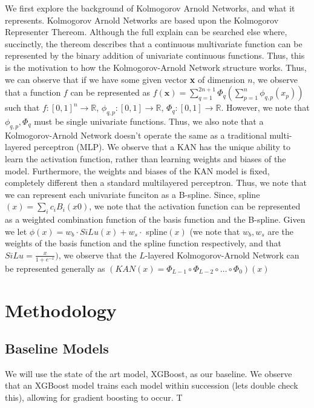 \documentclass{article} %
\begin{document}
We first explore the background of Kolmogorov Arnold Networks, and what it represents. Kolmogorov Arnold Networks are based upon the Kolmogorov Representer Thereom. Although the
full explain can be searched else where, succinctly, the thereom describes that a continuous multivariate function can be represented by the binary addition of
univariate continuous functions. Thus, this is the motivation to how the Kolmogorov-Arnold Network structure works. Thus, we can observe that if we have some given vector \textbf{x} of dimension $n$,
we observe that a function $f$ can be represented as $f(\textbf{x}) = \sum_{q = 1}^{2n + 1} \Phi_q(\sum_{p = 1}^{n}\phi_{q,p}(x_p))$ such that $f : [0,1]^{n} \rightarrow \mathbb{R} $, $\phi_{q,p}: [0,1] \rightarrow \mathbb{R}$, $\Phi_q : [0,1] \rightarrow \mathbb{R}$.
However, we note that $\phi_{q,p}, \Phi_q$ must be single univariate functions.
Thus, we also note that a Kolmogorov-Arnold
Network doesn't operate the same as a traditional multi-layered perceptron (MLP). We observe that a KAN has the unique ability to learn the activation function, rather than
learning weights and biases of the model. Furthermore, the weights and biases of the KAN model is fixed, completely different then a standard multilayered perceptron. Thus,
we note that we can represent each univariate funciton as a B-spline. Since, spline$(x) = \sum_i c_iB_i(x0)$, we note that the activation function can be represented as 
a weighted combination function of the basis function and the B-spline. Given we let $\phi(x) = w_b \cdot SiLu(x) + w_s \cdot$ spline$(x)$ (we note that $w_b,w_s$ are the weights of the basis function and the spline function respectively, and that $SiLu = \frac{x}{1 + e^{-x}})$,
we observe that the $L$-layered Kolmogorov-Arnold Network can be represented generally as $(KAN(x) = \Phi_{L-1} \circ \Phi_{L-2} \circ \dots \circ \Phi_0)(x)$

\section{Methodology}

\subsection{Baseline Models}

We will use the state of the art model, XGBoost, as our baseline. We observe that an XGBoost model trains each model within succession (lets double check this), allowing for gradient boosting to occur.
T
\end{document}
